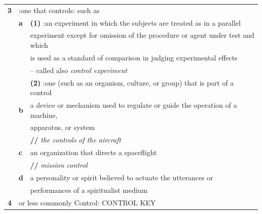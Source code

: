\begin{frame}
\myPause
\begin{tabular}{lll}
 \bf{3} & \multicolumn{2}{l}{:one that controls: such as} \\
        & \bf{a} & \textbf{(1)} :an experiment in which the subjects are treated as in a parallel \\
        &        &  experiment except for omission of the procedure or agent under test and which \\
        &        &  is used as a standard of comparison in judging experimental effects\vspace{1mm} \\
        &        & -- called also \emph{control experiment} \\
        &        & \textbf{(2)} :one (such as an organism, culture, or group) that is part of a control \\
        & \bf{b} & a device or mechanism used to regulate or guide the operation of a machine,\\
        &        & apparatus, or system \\
        &        & \textbf{//} \emph{the controls of the aircraft} \\
        & \bf{c} & an organization that directs a spaceflight \\
        &        & \textbf{//} \emph{mission control} \\
        & \bf{d} & a personality or spirit believed to actuate the utterances or\\
        &        & performances of a spiritualist medium \\
 \bf{4} & \multicolumn{2}{l}{or less commonly Control: CONTROL KEY}
\end{tabular}
\end{frame}

